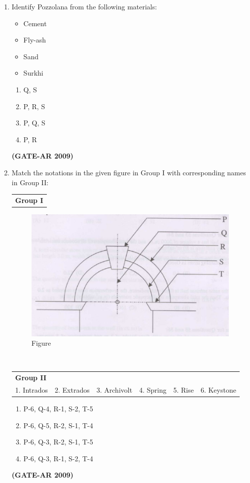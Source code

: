 \documentclass[a4paper,10pt]{article}
\begin{document}
\begin{enumerate}
    \item Identify Pozzolana from the following materials: 
    \begin{itemize}
        \item Cement
        \item Fly-ash
        \item Sand
        \item Surkhi
    \end{itemize}
    \begin{multicols}{2}
	\begin{enumerate}
        \item Q, S
        \item P, R, S
        \item P, Q, S
        \item P, R
    \end{enumerate}
	\end{multicols}
    \hfill \textbf{(GATE-AR 2009)}

	\item Match the notations in the given figure in Group I with corresponding names in Group II:  \\
    \begin{tabular}{ l }
	\textbf{Group I} \\
	\end{tabular}
	\begin{figure}[h!]
        \centering
        \includegraphics[width=0.5\linewidth]{figs/img_04.jpg}
	\caption{Figure}
	\end{figure} \\
    \begin{tabular}{ l l l l l l }
	\textbf{Group II} & & & & & \\
	1. Intrados & 2. Extrados & 3. Archivolt & 4. Spring & 5. Rise & 6. Keystone \\
	\end{tabular}	
	\begin{enumerate}
        \item P-6, Q-4, R-1, S-2, T-5
        \item P-6, Q-5, R-2, S-1, T-4
        \item P-6, Q-3, R-2, S-1, T-5
        \item P-6, Q-3, R-1, S-2, T-4
    \end{enumerate}
    \hfill \textbf{(GATE-AR 2009)}


\end{enumerate}
\end{document}
